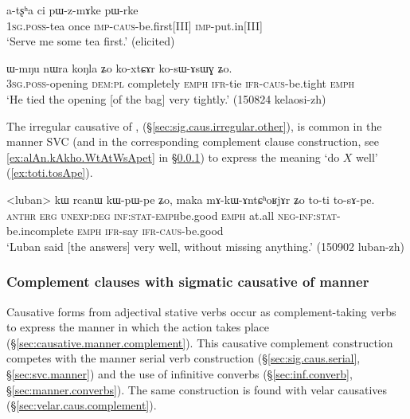 \begin{exe}
\ex \label{ex:pWzmAke}
\gll a-tʂʰa ci pɯ-z-mɤke pɯ-rke \\
\textsc{1sg}.\textsc{poss}-tea once \textsc{imp}-\textsc{caus}-be.first[III] \textsc{imp}-put.in[III] \\
\glt `Serve me some tea first.' (elicited)
\end{exe} 

\begin{exe}
\ex \label{ex:koxtCAr.kosAsWG}
\gll  ɯ-mŋu nɯra koŋla ʑo ko-xtɕɤr ko-sɯ-ɤsɯɣ ʑo. \\
\textsc{3sg}.\textsc{poss}-opening \textsc{dem}:\textsc{pl} completely \textsc{emph} \textsc{ifr}-tie \textsc{ifr}-\textsc{caus}-be.tight \textsc{emph} \\
\glt `He tied the opening [of the bag] very tightly.' (150824 kelaosi-zh)
\end{exe} 

The irregular causative of ,  (§\ref{sec:sig.caus.irregular.other}), is common in the manner SVC (and in the corresponding complement clause construction, see \ref{ex:alAn.kAkho.WtAtWsApet} in §\ref{sec:sig.caus.complement}) to express the meaning `do $X$ well' (\ref{ex:toti.tosApe}).

\begin{exe}
\ex \label{ex:toti.tosApe}
\gll <luban> kɯ rcanɯ kɯ-pɯ-pe ʑo, maka mɤ-kɯ-ɤntɕʰoʁjɤr ʑo to-ti to-sɤ-pe.  \\
  \textsc{anthr} \textsc{erg} \textsc{unexp}:\textsc{deg} \textsc{inf}:\textsc{stat}-\textsc{emph}\redp{}be.good \textsc{emph} at.all \textsc{neg}-\textsc{inf}:\textsc{stat}-be.incomplete \textsc{emph} \textsc{ifr}-say \textsc{ifr}-\textsc{caus}-be.good \\
\glt `Luban said [the answers] very well, without missing anything.' (150902 luban-zh)
\end{exe} 



\subsubsection{Complement clauses with sigmatic causative of manner} \label{sec:sig.caus.complement}
 
Causative forms from adjectival stative verbs occur as com\-ple\-ment-taking verbs to express the manner in which the action takes place (§\ref{sec:causative.manner.complement}). This causative complement construction competes with the manner serial verb construction (§\ref{sec:sig.caus.serial}, §\ref{sec:svc.manner}) and the use of infinitive converbs (§\ref{sec:inf.converb}, §\ref{sec:manner.converbs}). The same construction is found with velar causatives (§\ref{sec:velar.caus.complement}).

